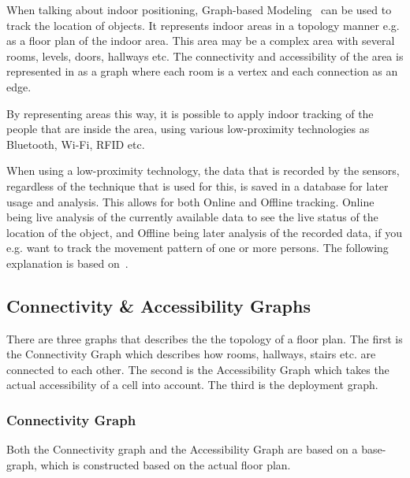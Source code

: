 When talking about indoor positioning, Graph-based Modeling~\cite{Jensen:2009:GMB:1590953.1591000} can be used to track the location of objects. 
It represents indoor areas in a topology manner e.g. as a floor plan of the indoor area. 
This area may be a complex area with several rooms, levels, doors, hallways etc. 
The connectivity and accessibility of the area is represented in as a graph where each room is a vertex and each connection as an edge. 

By representing areas this way, it is possible to apply indoor tracking of the people that are inside the area, using various low-proximity technologies as Bluetooth, Wi-Fi, RFID etc.

When using a low-proximity technology, the data that is recorded by the sensors, regardless of the technique that is used for this, is saved in a database for later usage and analysis. 
This allows for both Online and Offline tracking.
Online being live analysis of the currently available data to see the live status of the location of the object, and Offline being later analysis of the recorded data, if you e.g. want to track the movement pattern of one or more persons. 
The following explanation is based on~\cite{Jensen:2009:GMB:1590953.1591000}.


\subsection{Connectivity \& Accessibility Graphs}
There are three graphs that describes the the topology of a floor plan. 
The first is the Connectivity Graph which describes how rooms, hallways, stairs etc. are connected to each other. 
The second is the Accessibility Graph which takes the actual accessibility of a cell into account. 
The third is the deployment graph.


\subsubsection{ \quad Connectivity Graph}
Both the Connectivity graph and the Accessibility Graph are based on a base-graph, which is constructed based on the actual floor plan. 


